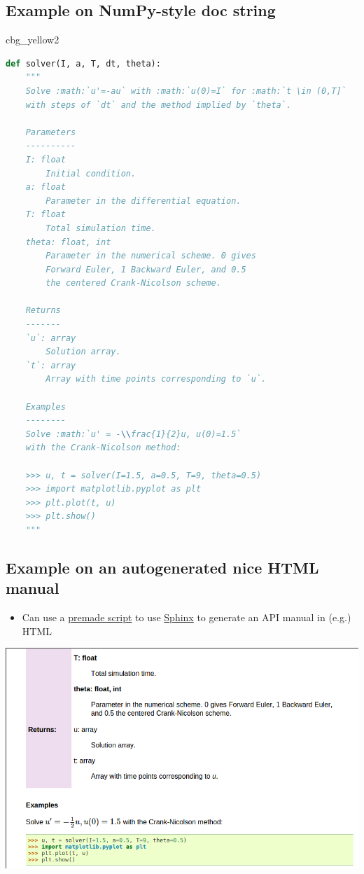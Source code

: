\documentclass[%
oneside,                 %
final,                   %
10pt]{article}
\newenvironment{_cod_tight}[1]{
   \def\FrameCommand{\colorbox{#1}}
   \FrameRule0.6pt\MakeFramed {\FrameRestore}\vskip3mm}
   {\vskip0mm\endMakeFramed}
\newenvironment{cod}[1]{
\bgroup\rmfamily
\fboxsep=0mm\relax
\begin{_cod_tight}{#1}
\list{}{\parsep=-2mm\parskip=0mm\topsep=0pt\leftmargin=2mm
\rightmargin=2\leftmargin\leftmargin=4pt\relax}
\item\relax}
{\endlist\end{_cod_tight}\egroup}
\begin{document}
\noindent
\subsection*{Example on NumPy-style doc string}

\begin{cod}{cbg_yellow2}\begin{lstlisting}[language=Python,style=simple,xleftmargin=2mm]
def solver(I, a, T, dt, theta):
    """
    Solve :math:`u'=-au` with :math:`u(0)=I` for :math:`t \in (0,T]`
    with steps of `dt` and the method implied by `theta`.

    Parameters
    ----------
    I: float
        Initial condition.
    a: float
        Parameter in the differential equation.
    T: float
        Total simulation time.
    theta: float, int
        Parameter in the numerical scheme. 0 gives
        Forward Euler, 1 Backward Euler, and 0.5
        the centered Crank-Nicolson scheme.

    Returns
    -------
    `u`: array
        Solution array.
    `t`: array
        Array with time points corresponding to `u`.

    Examples
    --------
    Solve :math:`u' = -\\frac{1}{2}u, u(0)=1.5`
    with the Crank-Nicolson method:

    >>> u, t = solver(I=1.5, a=0.5, T=9, theta=0.5)
    >>> import matplotlib.pyplot as plt
    >>> plt.plot(t, u)
    >>> plt.show()
    """
\end{lstlisting}\end{cod}
\noindent

\subsection*{Example on an autogenerated nice HTML manual}

\begin{itemize}
 \item Can use a \href{{http://tinyurl.com/ofkw6kc/softeng/make_sphinx_api.py}}{premade script} to use \href{{http://sphinx-doc.org/}}{Sphinx} to generate an API manual in (e.g.) HTML
\end{itemize}

\noindent
\centerline{\includegraphics[width=0.8\linewidth]{fig-softeng/selfdoc_numpy.png}}
\end{document}
